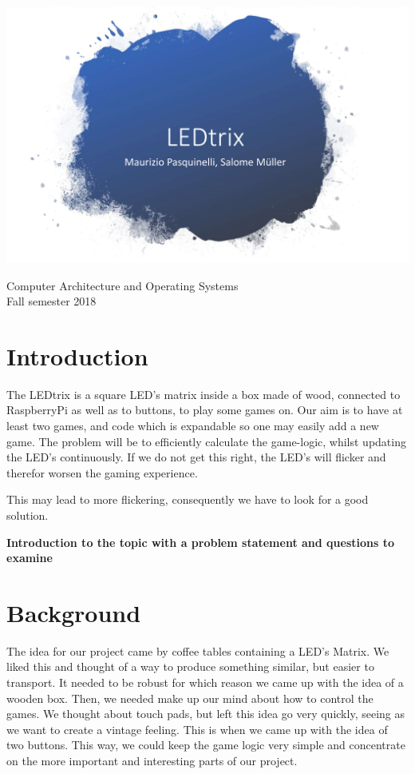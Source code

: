 \documentclass[a4paper,12pt]{article}
\begin{document}
\begin{titlepage}
\centering
\vspace*{5cm}

 \includegraphics[width = 1\textwidth]{LEDtrix_Logo.png}
\vspace{1cm}

\large{Computer Architecture and Operating Systems\\Fall semester 2018}
\end{titlepage}
 
 \section{Introduction}
 
 The LEDtrix is a square LED's matrix inside a box made of wood, connected to RaspberryPi as well as to buttons, to play some games on.
 Our aim is to have at least two games, and code which is expandable so one may easily add a new game.
 The problem will be to efficiently calculate the game-logic, whilst updating the LED's continuously.
 If we do not get this right, the LED's will flicker and therefor worsen the gaming experience.
 
 This may lead to more flickering, consequently we have to look for a good solution.
 
\textbf{Introduction to the topic with a problem statement and questions to examine}
 
 \section{Background}
 
 The idea for our project came by coffee tables containing a LED's Matrix.
 We liked this and thought of a way to produce something similar, but easier to transport.
 It needed to be robust for which reason we came up with the idea of a wooden box.
 Then, we needed make up our mind about how to control the games.
 We thought about touch pads, but left this idea go very quickly, seeing as we want to create a vintage feeling.
 This is when we came up with the idea of two buttons.
 This way, we could keep the game logic very simple and concentrate on the more important and interesting parts of our project.
 
\end{document}
